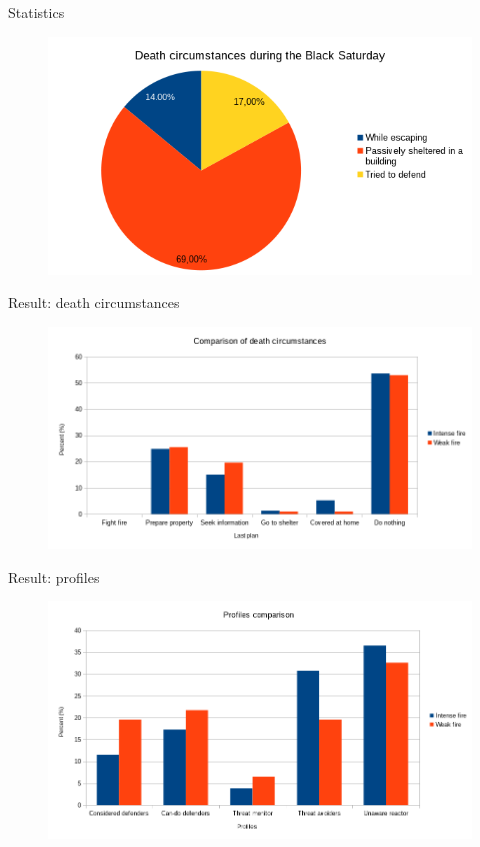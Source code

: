 \documentclass{beamer}
\begin{document}
    \begin{frame}{Statistics}
      \begin{figure}[h]
        \includegraphics[scale=0.6]{stat.png}
      \end{figure}
    \end{frame}

    \begin{frame}{Result: death circumstances}
	      \begin{figure}[h]
	        \hspace*{-3em}
	        \includegraphics[scale=0.55]{last-plan-comparison.png}
	      \end{figure}
    \end{frame}

    \begin{frame}{Result: profiles}
      \begin{figure}[h]
        \hspace*{-3em}
        \includegraphics[scale=0.54]{profils-comparison.png}
      \end{figure}
    \end{frame}
\end{document}
